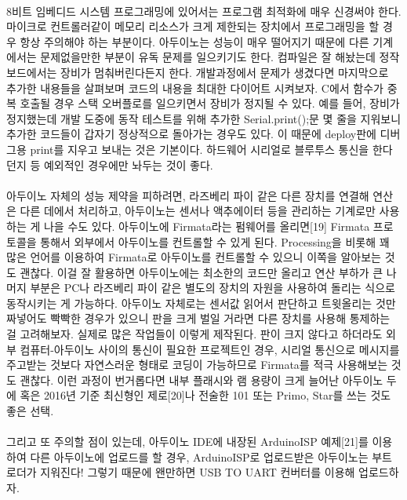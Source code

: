 \documentclass[12pt, a4paper, oneside]{book}
\begin{document}
\paragraph{}
8비트 임베디드 시스템 프로그래밍에 있어서는 프로그램 최적화에 매우 신경써야 한다. 마이크로 컨트롤러같이 메모리 리소스가 크게 제한되는 장치에서 프로그래밍을 할 경우 항상 주의해야 하는 부분이다. 아두이노는 성능이 매우 떨어지기 때문에 다른 기계에서는 문제없을만한 부분이 유독 문제를 일으키기도 한다. 컴파일은 잘 해놨는데 정작 보드에서는 장비가 멈춰버린다든지 한다. 개발과정에서 문제가 생겼다면 마지막으로 추가한 내용들을 살펴보며 코드의 내용을 최대한 다이어트 시켜보자.
C에서 함수가 중복 호출될 경우 스택 오버플로를 일으키면서 장비가 정지될 수 있다. 예를 들어, 장비가 정지했는데 개발 도중에 동작 테스트를 위해 추가한 Serial.print();문 몇 줄을 지워보니 추가한 코드들이 갑자기 정상적으로 돌아가는 경우도 있다. 이 때문에 deploy판에 디버그용 print를 지우고 보내는 것은 기본이다. 하드웨어 시리얼로 블루투스 통신을 한다던지 등 예외적인 경우에만 놔두는 것이 좋다.

\paragraph{}
아두이노 자체의 성능 제약을 피하려면, 라즈베리 파이 같은 다른 장치를 연결해 연산은 다른 데에서 처리하고, 아두이노는 센서나 액추에이터 등을 관리하는 기계로만 사용하는 게 나을 수도 있다. 아두이노에 Firmata라는 펌웨어를 올리면[19] Firmata 프로토콜을 통해서 외부에서 아두이노를 컨트롤할 수 있게 된다. Processing을 비롯해 꽤 많은 언어를 이용하여 Firmata로 아두이노를 컨트롤할 수 있으니 이쪽을 알아보는 것도 괜찮다. 이걸 잘 활용하면 아두이노에는 최소한의 코드만 올리고 연산 부하가 큰 나머지 부분은 PC나 라즈베리 파이 같은 별도의 장치의 자원을 사용하여 돌리는 식으로 동작시키는 게 가능하다. 아두이노 자체로는 센서값 읽어서 판단하고 트윗올리는 것만 짜넣어도 빡빡한 경우가 있으니 판을 크게 벌일 거라면 다른 장치를 사용해 통제하는 걸 고려해보자. 실제로 많은 작업들이 이렇게 제작된다. 판이 크지 않다고 하더라도 외부 컴퓨터-아두이노 사이의 통신이 필요한 프로젝트인 경우, 시리얼 통신으로 메시지를 주고받는 것보다 자연스러운 형태로 코딩이 가능하므로 Firmata를 적극 사용해보는 것도 괜찮다. 이런 과정이 번거롭다면 내부 플래시와 램 용량이 크게 늘어난 아두이노 두에 혹은 2016년 기준 최신형인 제로[20]나 전술한 101 또는 Primo, Star를 쓰는 것도 좋은 선택.

\paragraph{}
그리고 또 주의할 점이 있는데, 아두이노 IDE에 내장된 ArduinoISP 예제[21]를 이용하여 다른 아두이노에 업로드를 할 경우, ArduinoISP로 업로드받은 아두이노는 부트로더가 지워진다! 그렇기 때문에 왠만하면 USB TO UART 컨버터를 이용해 업로드하자.
\end{document}
